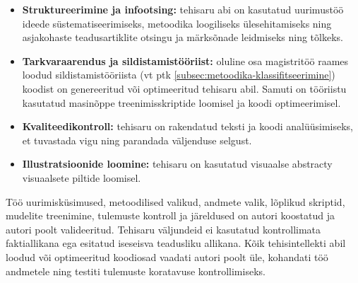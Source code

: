 \begin{itemize}
    \item \textbf{Struktureerimine ja infootsing:} tehisaru abi on kasutatud uurimustöö ideede süstematiseerimiseks, metoodika loogiliseks ülesehitamiseks ning asjakohaste teadusartiklite otsingu ja märksõnade leidmiseks ning tõlkeks.
    \item \textbf{Tarkvaraarendus ja sildistamistööriist:} oluline osa magistritöö raames loodud sildistamistööriista (vt ptk \ref{subsec:metoodika-klassifitseerimine}) koodist on genereeritud või optimeeritud tehisaru abil. Samuti on tööriistu kasutatud masinõppe treenimisskriptide loomisel ja koodi optimeerimisel.
    \item \textbf{Kvaliteedikontroll:} tehisaru on rakendatud teksti ja koodi analüüsimiseks, et tuvastada vigu ning parandada väljenduse selgust.
    \item \textbf{Illustratsioonide loomine:} tehisaru on kasutatud visuaalse abstracty visuaalsete piltide loomisel.
\end{itemize}
Töö uurimisküsimused, metoodilised valikud, andmete valik, lõplikud skriptid, mudelite treenimine, tulemuste kontroll ja järeldused on autori koostatud ja autori poolt valideeritud. Tehisaru väljundeid ei kasutatud kontrollimata faktiallikana ega esitatud iseseisva teadusliku allikana. Kõik tehisintellekti abil loodud või optimeeritud koodiosad vaadati autori poolt üle, kohandati töö andmetele ning testiti tulemuste koratavuse kontrollimiseks.
